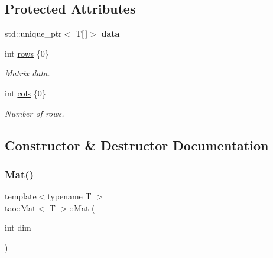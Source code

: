 \subsection*{Protected Attributes}
\begin{DoxyCompactItemize}
\item 
\mbox{\label{classtao_1_1_mat_abd0a080dca7580acf5fdba2086d04802}} 
std\+::unique\+\_\+ptr$<$ T\mbox{[}$\,$\mbox{]}$>$ {\bfseries data}
\item 
\mbox{\label{classtao_1_1_mat_adba65952e3b69680bd1d9f6477c20d7d}} 
int \mbox{\hyperlink{classtao_1_1_mat_adba65952e3b69680bd1d9f6477c20d7d}{rows}} \{0\}
\begin{DoxyCompactList}\small\item\em Matrix data. \end{DoxyCompactList}\item 
\mbox{\label{classtao_1_1_mat_a80e80ef1ee80e33719d9637153186ee4}} 
int \mbox{\hyperlink{classtao_1_1_mat_a80e80ef1ee80e33719d9637153186ee4}{cols}} \{0\}
\begin{DoxyCompactList}\small\item\em Number of rows. \end{DoxyCompactList}\end{DoxyCompactItemize}


\subsection{Constructor \& Destructor Documentation}
\mbox{\label{classtao_1_1_mat_a22ea16d2a3e3a1da5eb7de57e5bf02c2}} 
\subsubsection{\texorpdfstring{Mat()}{Mat()}\hspace{0.1cm}{\footnotesize\ttfamily [1/5]}}
{\footnotesize\ttfamily template$<$typename T $>$ \\
\mbox{\hyperlink{classtao_1_1_mat}{tao\+::\+Mat}}$<$ T $>$\+::\mbox{\hyperlink{classtao_1_1_mat}{Mat}} (\begin{DoxyParamCaption}\item[{int}]{dim }\end{DoxyParamCaption})}



